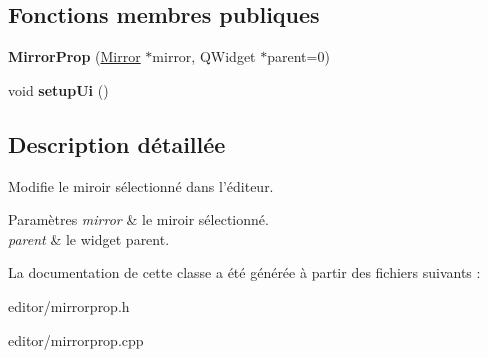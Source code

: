 \subsection*{Fonctions membres publiques}
\begin{DoxyCompactItemize}
\item 
\hypertarget{classMirrorProp_a66f3827e136a4de797881f58e3b2c2f5}{{\bfseries Mirror\+Prop} (\hyperlink{classMirror}{Mirror} $\ast$mirror, Q\+Widget $\ast$parent=0)}\label{classMirrorProp_a66f3827e136a4de797881f58e3b2c2f5}

\item 
\hypertarget{classMirrorProp_a78eb9900a2efb1ac16bae7956d21ac65}{void {\bfseries setup\+Ui} ()}\label{classMirrorProp_a78eb9900a2efb1ac16bae7956d21ac65}

\end{DoxyCompactItemize}


\subsection{Description détaillée}
Modifie le miroir sélectionné dans l’éditeur. 


\begin{DoxyParams}{Paramètres}
{\em mirror} & le miroir sélectionné. \\
\hline
{\em parent} & le widget parent. \\
\hline
\end{DoxyParams}


La documentation de cette classe a été générée à partir des fichiers suivants \+:\begin{DoxyCompactItemize}
\item 
editor/mirrorprop.\+h\item 
editor/mirrorprop.\+cpp\end{DoxyCompactItemize}
